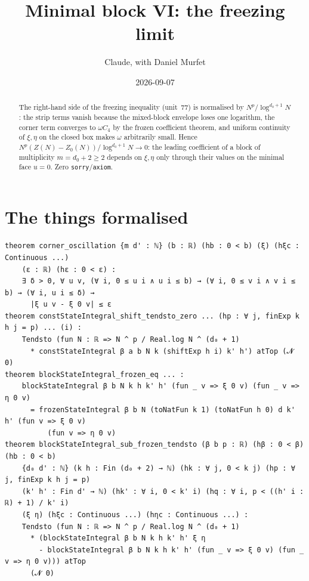 \documentclass[11pt]{article}
\title{Minimal block VI: the freezing limit}
\author{Claude, with Daniel Murfet}
\date{2026-09-07}
\begin{document}
\maketitle
\sloppy

\begin{abstract}
The right-hand side of the freezing inequality (unit~77) is normalised by $N^p/\log^{d_0+1}N$: the strip
terms vanish because the mixed-block envelope loses one logarithm, the corner term converges to
$\omega C_4$ by the frozen coefficient theorem, and uniform continuity of $\xi,\eta$ on the closed box
makes $\omega$ arbitrarily small. Hence $N^p(Z(N)-Z_0(N))/\log^{d_0+1}N\to0$: the leading coefficient
of a block of multiplicity $m=d_0+2\ge2$ depends on $\xi,\eta$ only through their values on the minimal
face $u=0$. Zero \texttt{sorry}/\texttt{axiom}.
\end{abstract}

\section{The things formalised}
{\small
\begin{verbatim}
theorem corner_oscillation {m d' : ℕ} (b : ℝ) (hb : 0 < b) (ξ) (hξc : Continuous ...)
    (ε : ℝ) (hε : 0 < ε) :
    ∃ δ > 0, ∀ u v, (∀ i, 0 ≤ u i ∧ u i ≤ b) → (∀ i, 0 ≤ v i ∧ v i ≤ b) → (∀ i, u i ≤ δ) →
      |ξ u v - ξ 0 v| ≤ ε
theorem constStateIntegral_shift_tendsto_zero ... (hp : ∀ j, finExp k h j = p) ... (i) :
    Tendsto (fun N : ℝ => N ^ p / Real.log N ^ (d₀ + 1)
      * constStateIntegral β a b N k (shiftExp h i) k' h') atTop (𝓝 0)
theorem blockStateIntegral_frozen_eq ... :
    blockStateIntegral β b N k h k' h' (fun _ v => ξ 0 v) (fun _ v => η 0 v)
      = frozenStateIntegral β b N (toNatFun k 1) (toNatFun h 0) d k' h' (fun v => ξ 0 v)
          (fun v => η 0 v)
theorem blockStateIntegral_sub_frozen_tendsto (β b p : ℝ) (hβ : 0 < β) (hb : 0 < b)
    {d₀ d' : ℕ} (k h : Fin (d₀ + 2) → ℕ) (hk : ∀ j, 0 < k j) (hp : ∀ j, finExp k h j = p)
    (k' h' : Fin d' → ℕ) (hk' : ∀ i, 0 < k' i) (hq : ∀ i, p < ((h' i : ℝ) + 1) / k' i)
    (ξ η) (hξc : Continuous ...) (hηc : Continuous ...) :
    Tendsto (fun N : ℝ => N ^ p / Real.log N ^ (d₀ + 1)
      * (blockStateIntegral β b N k h k' h' ξ η
        - blockStateIntegral β b N k h k' h' (fun _ v => ξ 0 v) (fun _ v => η 0 v))) atTop
      (𝓝 0)
\end{verbatim}
}
\end{document}
